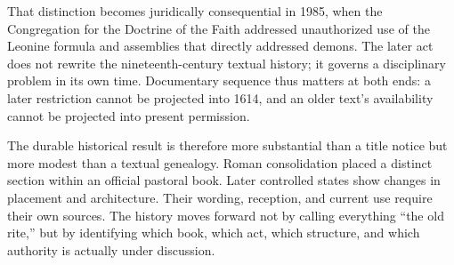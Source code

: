 That distinction becomes juridically consequential in 1985, when the
Congregation for the Doctrine of the Faith addressed unauthorized use of the
Leonine formula and assemblies that directly addressed demons. The later act
does not rewrite the nineteenth-century textual history; it governs a
disciplinary problem in its own time. Documentary sequence thus matters at
both ends: a later restriction cannot be projected into 1614, and an older
text's availability cannot be projected into present permission.

The durable historical result is therefore more substantial than a title
notice but more modest than a textual genealogy. Roman consolidation placed a
distinct section within an official pastoral book. Later controlled states
show changes in placement and architecture. Their wording, reception, and
current use require their own sources. The history moves forward not by
calling everything ``the old rite,'' but by identifying which book, which
act, which structure, and which authority is actually under discussion.
